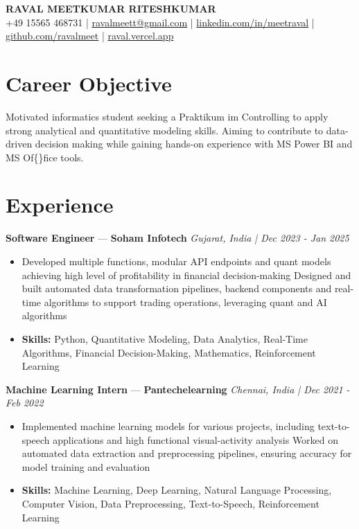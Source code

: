\documentclass[a4paper,10pt]{article}
\begin{document}
\begin{center}
  {\Large\bfseries RAVAL MEETKUMAR RITESHKUMAR}\\[2pt]
  {\small +49 15565 468731 \;|\; \href{mailto:ravalmeett@gmail.com}{ravalmeett@gmail.com} \;|\; \href{https://www.linkedin.com/in/meetraval/}{linkedin.com/in/meetraval} \;|\; \href{https://github.com/ravalmeet}{github.com/ravalmeet} \;|\; \href{https://raval.vercel.app/}{raval.vercel.app}}
\end{center}
\vspace{-3pt}

\section*{Career Objective}
Motivated informatics student seeking a Praktikum im Controlling to apply strong analytical and quantitative modeling skills. Aiming to contribute to data-driven decision making while gaining hands-on experience with MS Power BI and MS Of\{\}fice tools.\par

\section*{Experience}
\textbf{Software Engineer} — \textbf{Soham Infotech} \hfill \textit{Gujarat, India \;|\; Dec 2023 - Jan 2025}\par
\vspace{1pt}
\begin{itemize}
  \item Developed multiple functions, modular API endpoints and quant models achieving high level of profitability in financial decision-making Designed and built automated data transformation pipelines, backend components and real-time algorithms to support trading operations, leveraging quant and AI algorithms
  \item \textbf{Skills:} Python, Quantitative Modeling, Data Analytics, Real-Time Algorithms, Financial Decision-Making, Mathematics, Reinforcement Learning
\end{itemize}
\vspace{3pt}
\textbf{Machine Learning Intern} — \textbf{Pantechelearning} \hfill \textit{Chennai, India \;|\; Dec 2021 - Feb 2022}\par
\vspace{1pt}
\begin{itemize}
  \item Implemented machine learning models for various projects, including text-to-speech applications and high functional visual-activity analysis Worked on automated data extraction and preprocessing pipelines, ensuring accuracy for model training and evaluation
  \item \textbf{Skills:} Machine Learning, Deep Learning, Natural Language Processing, Computer Vision, Data Preprocessing, Text-to-Speech, Reinforcement Learning
\end{itemize}
\end{document}

